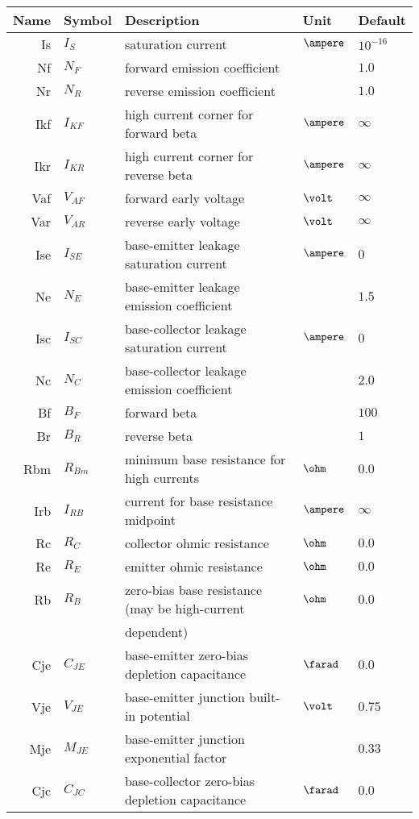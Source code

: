 \begin{longtable}{rllll}
Name & Symbol & Description & Unit & Default\\
\hline
\endhead
Is & $I_{S}$ & saturation current & $\ampere$ & $10^{-16}$\\
Nf & $N_F$ & forward emission coefficient & & $1.0$\\
Nr & $N_R$ & reverse emission coefficient & & $1.0$\\
Ikf & $I_{KF}$ & high current corner for forward beta & $\ampere$ & $\infty$\\
Ikr & $I_{KR}$ & high current corner for reverse beta & $\ampere$ & $\infty$\\
Vaf & $V_{AF}$ & forward early voltage & $\volt$ & $\infty$\\
Var & $V_{AR}$ & reverse early voltage & $\volt$ & $\infty$\\
Ise & $I_{SE}$ & base-emitter leakage saturation current & $\ampere$ & $0$\\
Ne & $N_E$ & base-emitter leakage emission coefficient & & $1.5$\\
Isc & $I_{SC}$ & base-collector leakage saturation current & $\ampere$ & $0$\\
Nc & $N_C$ & base-collector leakage emission coefficient & & $2.0$\\
Bf & $B_F$ & forward beta & & $100$\\
Br & $B_R$ & reverse beta & & $1$\\
Rbm & $R_{Bm}$ & minimum base resistance for high currents & $\ohm$ & $0.0$\\
Irb & $I_{RB}$ & current for base resistance midpoint & $\ampere$ & $\infty$\\
Rc & $R_{C}$ & collector ohmic resistance & $\ohm$ & $0.0$\\
Re & $R_{E}$ & emitter ohmic resistance & $\ohm$ & $0.0$\\
Rb & $R_{B}$ & zero-bias base resistance (may be high-current & $\ohm$ & $0.0$\\
& & dependent) & &\\
Cje & $C_{JE}$ & base-emitter zero-bias depletion capacitance & $\farad$ & $0.0$\\
Vje & $V_{JE}$ & base-emitter junction built-in potential & $\volt$ & $0.75$\\
Mje & $M_{JE}$ & base-emitter junction exponential factor & & $0.33$\\
Cjc & $C_{JC}$ & base-collector zero-bias depletion capacitance & $\farad$ & $0.0$\\

\end{longtable}
